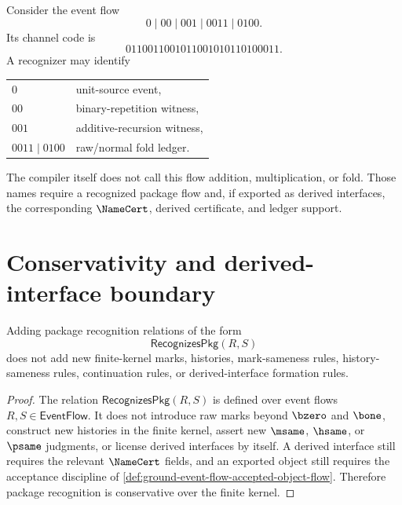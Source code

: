 \begin{example}
\label{ex:package-generated-add-fold-skeleton}
Consider the event flow
$$
  0 \mid 00 \mid 001 \mid 0011 \mid 0100.
$$
Its channel code is
$$
  0110011001011001010110100011.
$$
A recognizer may identify
\begin{center}
\begin{tabular}{ll}
  $0$             & unit-source event, \\
  $00$            & binary-repetition witness, \\
  $001$           & additive-recursion witness, \\
  $0011 \mid 0100$ & raw/normal fold ledger.
\end{tabular}
\end{center}
The compiler itself does not call this flow addition, multiplication, or fold. Those names require a recognized package flow and, if exported as derived interfaces, the corresponding $\NameCert$, derived certificate, and ledger support.
\end{example}

\section{Conservativity and derived-interface boundary}
\label{sec:package-generated-conservativity}

\begin{theorem}
\label{thm:package-generated-conservativity}
Adding package recognition relations of the form
$$
  \mathsf{RecognizesPkg}(R,S)
$$
does not add new finite-kernel marks, histories, mark-sameness rules, history-sameness rules, continuation rules, or derived-interface formation rules.
\end{theorem}

\begin{proof}
The relation $\mathsf{RecognizesPkg}(R,S)$ is defined over event flows $R,S \in \mathsf{EventFlow}$. It does not introduce raw marks beyond $\bzero$ and $\bone$, construct new histories in the finite kernel, assert new $\msame$, $\hsame$, or $\psame$ judgments, or license derived interfaces by itself. A derived interface still requires the relevant $\NameCert$ fields, and an exported object still requires the acceptance discipline of \autoref{def:ground-event-flow-accepted-object-flow}. Therefore package recognition is conservative over the finite kernel.
\end{proof}

